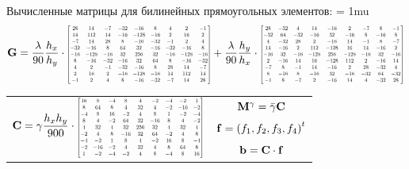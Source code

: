 Вычисленные матрицы для билинейных прямоугольных элементов:
\setlength{\arraycolsep}{2.5pt} %
\medmuskip = 1mu
$$ \mb{G} = \frac{\lambda}{90}\frac{h_{x}}{h_{y}}\cdot\scalemath{0.5}{\left[\begin{matrix}28 & 14 & -7 & -32 & -16 & 8 & 4 & 2 & -1\\14 & 112 & 14 & -16 & -128 & -16 & 2 & 16 & 2\\-7 & 14 & 28 & 8 & -16 & -32 & -1 & 2 & 4\\-32 & -16 & 8 & 64 & 32 & -16 & -32 & -16 & 8\\-16 & -128 & -16 & 32 & 256 & 32 & -16 & -128 & -16\\8 & -16 & -32 & -16 & 32 & 64 & 8 & -16 & -32\\4 & 2 & -1 & -32 & -16 & 8 & 28 & 14 & -7\\2 & 16 & 2 & -16 & -128 & -16 & 14 & 112 & 14\\-1 & 2 & 4 & 8 & -16 & -32 & -7 & 14 & 28\end{matrix}\right]} + \frac{\lambda}{90}\frac{h_{y}}{h_{x}}\cdot\scalemath{0.5}{\left[\begin{matrix}28 & -32 & 4 & 14 & -16 & 2 & -7 & 8 & -1\\-32 & 64 & -32 & -16 & 32 & -16 & 8 & -16 & 8\\4 & -32 & 28 & 2 & -16 & 14 & -1 & 8 & -7\\14 & -16 & 2 & 112 & -128 & 16 & 14 & -16 & 2\\-16 & 32 & -16 & -128 & 256 & -128 & -16 & 32 & -16\\2 & -16 & 14 & 16 & -128 & 112 & 2 & -16 & 14\\-7 & 8 & -1 & 14 & -16 & 2 & 28 & -32 & 4\\8 & -16 & 8 & -16 & 32 & -16 & -32 & 64 & -32\\-1 & 8 & -7 & 2 & -16 & 14 & 4 & -32 & 28\end{matrix}\right]}
$$

\begin{center}
\begin{tabular}{cc}
\multirow{3}{*}{$\displaystyle \mb{C} = \gamma \frac{h_{x} h_{y}}{900}\cdot\scalemath{0.5}{\left[\begin{matrix}16 & 8 & -4 & 8 & 4 & -2 & -4 & -2 & 1\\8 & 64 & 8 & 4 & 32 & 4 & -2 & -16 & -2\\-4 & 8 & 16 & -2 & 4 & 8 & 1 & -2 & -4\\8 & 4 & -2 & 64 & 32 & -16 & 8 & 4 & -2\\4 & 32 & 4 & 32 & 256 & 32 & 4 & 32 & 4\\-2 & 4 & 8 & -16 & 32 & 64 & -2 & 4 & 8\\-4 & -2 & 1 & 8 & 4 & -2 & 16 & 8 & -4\\-2 & -16 & -2 & 4 & 32 & 4 & 8 & 64 & 8\\1 & -2 & -4 & -2 & 4 & 8 & -4 & 8 & 16\end{matrix}\right]} $} & $ \mathbf{M}^\gamma = \bar{\gamma}\mathbf{C} $ \\[1.25ex]
& $ \mathbf{f} = \left(f_1, f_2, f_3, f_4\right)^t $ \\[1.25ex]
& $ \mathbf{b} = \mathbf{C}\cdot \mathbf{f} $
\end{tabular}
\end{center}

